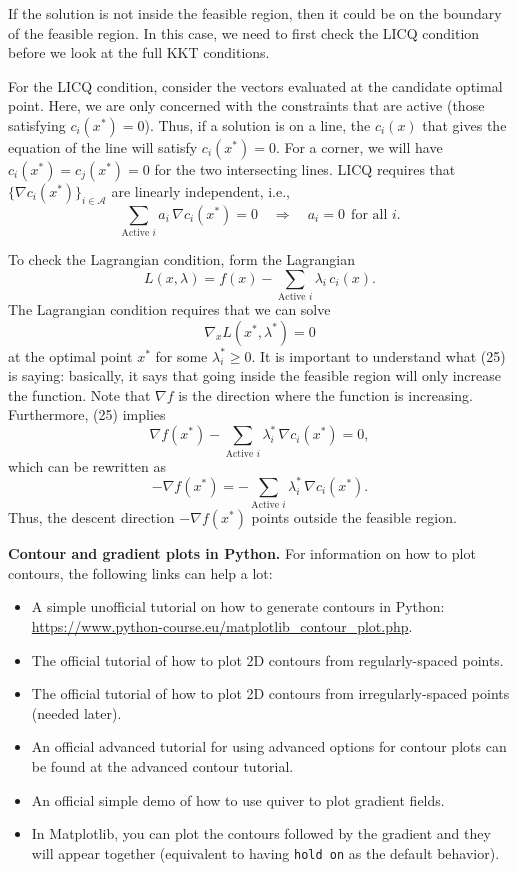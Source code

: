 \documentclass[11pt]{article}
\begin{document}
\begin{enumerate}[label=6(\alph*)]
	If the solution is not inside the feasible region, then it could be on the boundary of the feasible region. In this case, we need to first check the LICQ condition before we look at the full KKT conditions.
	
	For the LICQ condition, consider the vectors evaluated at the candidate optimal point. Here, we are only concerned with the constraints that are active (those satisfying $c_i(x^*)=0$). Thus, if a solution is on a line, the $c_i(x)$ that gives the equation of the line will satisfy $c_i(x^*)=0$. For a corner, we will have $c_i(x^*)=c_j(x^*)=0$ for the two intersecting lines. LICQ requires that $\{\nabla c_i(x^*)\}_{i\in\mathcal{A}}$ are linearly independent, i.e.,
	\[
	\sum_{\text{Active } i} a_i\,\nabla c_i(x^*)=0 \quad\Longrightarrow\quad a_i=0\ \ \text{for all $i$.} \tag{23}
	\]
	
	To check the Lagrangian condition, form the Lagrangian
	\[
	L(x,\lambda)=f(x)-\sum_{\text{Active } i}\lambda_i\,c_i(x). \tag{24}
	\]
	The Lagrangian condition requires that we can solve
	\[
	\nabla_x L(x^*,\lambda^*)=0 \tag{25}
	\]
	at the optimal point $x^*$ for some $\lambda_i^*\ge 0$. It is important to understand what (25) is saying: basically, it says that going inside the feasible region will only increase the function. Note that $\nabla f$ is the direction where the function is increasing. Furthermore, (25) implies
	\[
	\nabla f(x^*)-\sum_{\text{Active } i}\lambda_i^*\,\nabla c_i(x^*)=0, \tag{26}
	\]
	which can be rewritten as
	\[
	-\nabla f(x^*)=-\sum_{\text{Active } i}\lambda_i^*\,\nabla c_i(x^*). \tag{27}
	\]
	Thus, the descent direction $-\nabla f(x^*)$ points outside the feasible region.
\end{enumerate}

\medskip
\noindent\textbf{Contour and gradient plots in Python.}
For information on how to plot contours, the following links can help a lot:
\begin{itemize}
	\item A simple unofficial tutorial on how to generate contours in Python: \url{https://www.python-course.eu/matplotlib_contour_plot.php}.
	\item The official tutorial of how to plot 2D contours from regularly-spaced points.
	\item The official tutorial of how to plot 2D contours from irregularly-spaced points (needed later).
	\item An official advanced tutorial for using advanced options for contour plots can be found at the advanced contour tutorial.
	\item An official simple demo of how to use quiver to plot gradient fields.
	\item In Matplotlib, you can plot the contours followed by the gradient and they will appear together (equivalent to having \texttt{hold on} as the default behavior).
\end{itemize}
\end{document}
